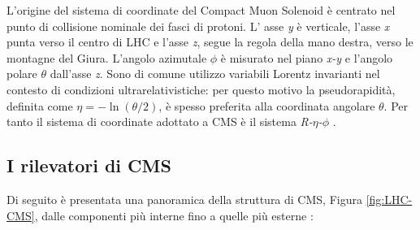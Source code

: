 L'origine del sistema di coordinate del Compact Muon Solenoid è centrato nel punto di collisione nominale dei fasci di protoni. L' asse \textit{y} è verticale, l'asse \textit{x} punta verso il centro di LHC e l'asse \textit{z}, segue la regola della mano destra, verso le montagne del Giura. L'angolo azimutale $\phi$ è misurato nel piano \textit{x-y} e l'angolo polare $\theta$ dall'asse \textit{z}. Sono di comune utilizzo variabili Lorentz invarianti nel contesto di condizioni ultrarelativistiche: per questo motivo la pseudorapidità, definita come $\eta = -\ln\left(\theta/2\right)$, è spesso preferita alla coordinata angolare $\theta$. Per tanto il sistema di coordinate adottato a CMS è il sistema \textit{R-$\eta$-$\phi$} \cite{Quertenmont:2010ota}.

\newpage

\subsection{I rilevatori di CMS}

Di seguito è presentata una panoramica della struttura di CMS, Figura \ref{fig:LHC-CMS}, dalle componenti più interne fino a quelle più esterne \cite{MasterThesisNicLai}:

